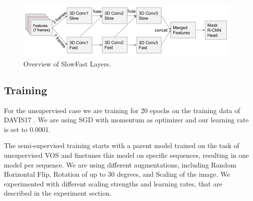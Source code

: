 \begin{figure}
	\centering
	\includegraphics[width=\columnwidth]{figures/slowfast.png}
	\caption{Overview of SlowFast Layers.}
	\label{slowfast}
\end{figure}
\subsection{Training}
For the unsupervised case we are training for 20 epochs on the training data of DAVIS17 \cite{davis_2017}. We are using SGD with momentum as optimizer and our learning rate is set to 0.0001.

The semi-supervised training starts with a parent model trained on the task of unsupervised VOS and finetunes this model on specific sequences, resulting in one model per sequence. We are using different augmentations, including Random Horizontal Flip, Rotation of up to 30 degrees, and Scaling of the image. We experimented with different scaling strengths and learning rates, that are described in the experiment section.
